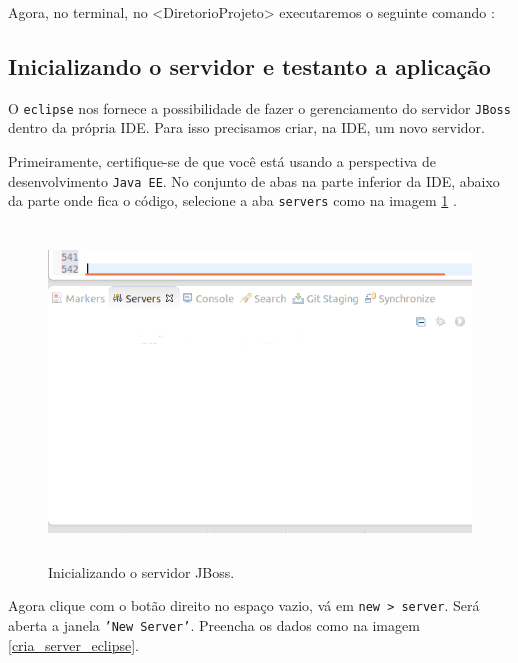 Agora, no terminal, no <DiretorioProjeto> executaremos o seguinte comando :

\begin{framed}
	
\end{framed}

\subsection{Inicializando o servidor e testanto a aplicação}

O \texttt{eclipse} nos fornece a possibilidade de fazer o gerenciamento do
servidor \texttt{JBoss} dentro da própria IDE. Para isso precisamos criar, na
IDE, um novo servidor. 

Primeiramente, certifique-se de que você está usando a perspectiva de
desenvolvimento \texttt{Java EE}. No conjunto de abas na parte
inferior da IDE, abaixo da parte onde fica o código, selecione a aba
\texttt{servers} como na imagem \ref{seleciona_server_eclipse} .

\begin{figure}[H]
	\centering
	\includegraphics[width=400pt,height=250pt]{imgs/tutorial-mdarte-0021.png}
	\caption{Inicializando o servidor JBoss.}
	\label{seleciona_server_eclipse}
\end{figure}

Agora clique com o botão direito no espaço vazio, vá em \texttt{new > server}.
Será aberta a janela \texttt{'New Server'}. Preencha os dados como na imagem
\ref{cria_server_eclipse}.

